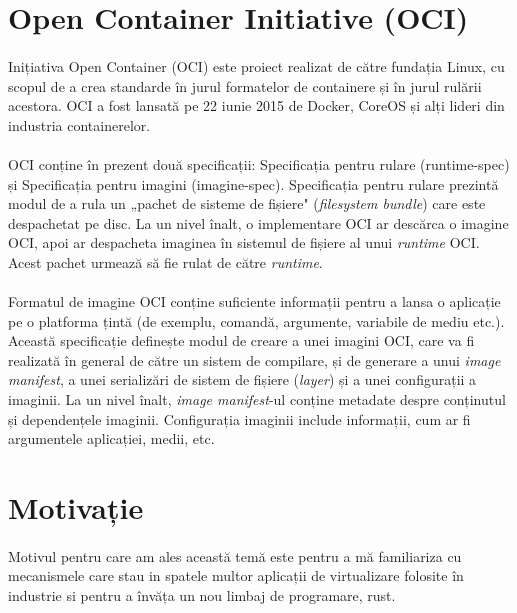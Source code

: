 \section{Open Container Initiative (OCI)}
    \paragraph{} Inițiativa Open Container (OCI) este proiect realizat de către fundația Linux, cu scopul de a crea standarde în jurul formatelor de containere și în jurul rulării acestora. OCI a fost lansată pe 22 iunie 2015 de Docker, CoreOS și alți lideri din industria containerelor.
    \paragraph{} OCI conține în prezent două specificații: Specificația pentru rulare (runtime-spec) și Specificația pentru imagini (imagine-spec). Specificația pentru rulare prezintă modul de a rula un „pachet de sisteme de fișiere" (\textit{filesystem bundle}) care este despachetat pe disc. La un nivel înalt, o implementare OCI ar descărca o imagine OCI, apoi ar despacheta imaginea în sistemul de fișiere al unui \textit{runtime} OCI. Acest pachet urmează să fie rulat de către \textit{runtime}.
    \paragraph{} Formatul de imagine OCI conține suficiente informații pentru a lansa o aplicație pe o platforma țintă (de exemplu, comandă, argumente, variabile de mediu etc.). Această specificație definește modul de creare a unei imagini OCI, care va fi realizată în general de către un sistem de compilare, și de generare a unui \textit{image manifest}, a unei serializări de sistem de fișiere (\textit{layer}) și a unei configurații a imaginii. La un nivel înalt, \textit{image manifest}-ul conține metadate despre conținutul și dependențele imaginii. Configurația imaginii include informații, cum ar fi argumentele aplicației, medii, etc.

\section{Motivație}
    \paragraph{} Motivul pentru care am ales această temă este pentru a mă familiariza cu mecanismele care stau in spatele multor aplicații de virtualizare folosite în industrie si pentru a învăța un nou limbaj de programare, rust.